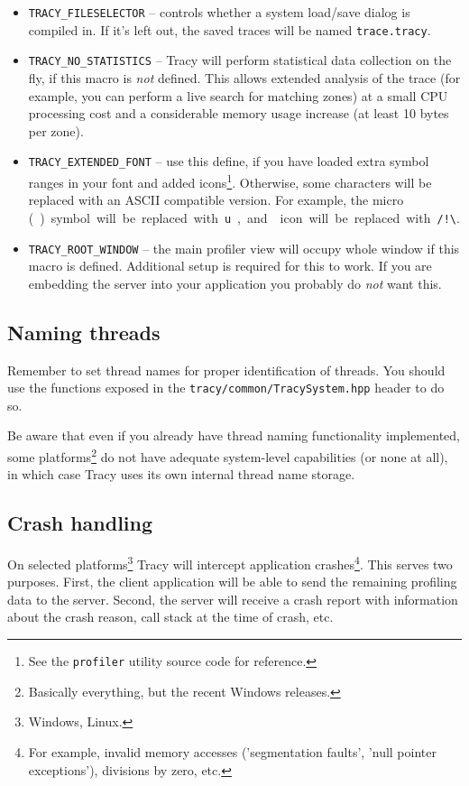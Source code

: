 \documentclass[hidelinks,titlepage,a4paper]{article}
\begin{document}
\begin{itemize}
\item \texttt{TRACY\_FILESELECTOR} -- controls whether a system load/save dialog is compiled in. If it's left out, the saved traces will be named \texttt{trace.tracy}.
\item \texttt{TRACY\_NO\_STATISTICS} -- Tracy will perform statistical data collection on the fly, if this macro is \emph{not} defined. This allows extended analysis of the trace (for example, you can perform a live search for matching zones) at a small CPU processing cost and a considerable memory usage increase (at least 10 bytes per zone).
\item \texttt{TRACY\_EXTENDED\_FONT} -- use this define, if you have loaded extra symbol ranges in your font and added icons\footnote{See the \texttt{profiler} utility source code for reference.}. Otherwise, some characters will be replaced with an ASCII compatible version. For example, the micro (\si\micro) symbol will be replaced with \texttt{u}, and \faExclamationTriangle{} icon will be replaced with \texttt{/!\textbackslash}.
\item \texttt{TRACY\_ROOT\_WINDOW} -- the main profiler view will occupy whole window if this macro is defined. Additional setup is required for this to work. If you are embedding the server into your application you probably do \emph{not} want this.
\end{itemize}

\subsection{Naming threads}

Remember to set thread names for proper identification of threads. You should use the functions exposed in the \texttt{tracy/common/TracySystem.hpp} header to do so.

Be aware that even if you already have thread naming functionality implemented, some platforms\footnote{Basically everything, but the recent Windows releases.} do not have adequate system-level capabilities (or none at all), in which case Tracy uses its own internal thread name storage.

\subsection{Crash handling}

On selected platforms\footnote{Windows, Linux.} Tracy will intercept application crashes\footnote{For example, invalid memory accesses ('segmentation faults', 'null pointer exceptions'), divisions by zero, etc.}. This serves two purposes. First, the client application will be able to send the remaining profiling data to the server. Second, the server will receive a crash report with information about the crash reason, call stack at the time of crash, etc.
\end{document}
